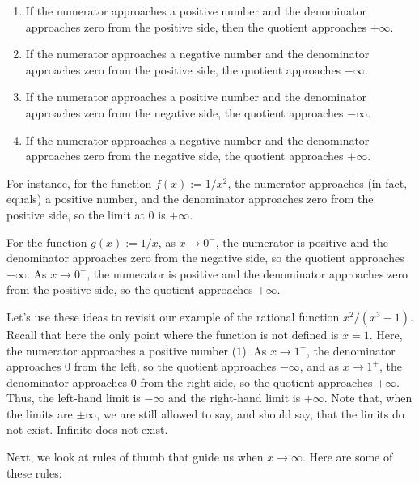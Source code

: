 \documentclass{amsart}
\begin{document}
\begin{enumerate}
\item If the numerator approaches a positive number and the
  denominator approaches zero from the positive side, then the
  quotient approaches $+\infty$. 
\item If the numerator approaches a negative number and the
  denominator approaches zero from the positive side, the quotient
  approaches $-\infty$.
\item If the numerator approaches a positive number and the
  denominator approaches zero from the negative side, the quotient
  approaches $-\infty$.
\item If the numerator approaches a negative number and the
  denominator approaches zero from the negative side, the quotient
  approaches $+\infty$.
\end{enumerate}

For instance, for the function $f(x) := 1/x^2$, the numerator
approaches (in fact, equals) a positive number, and the denominator
approaches zero from the positive side, so the limit at $0$ is
$+\infty$.

For the function $g(x) := 1/x$, as $x \to 0^-$, the numerator is
positive and the denominator approaches zero from the negative side,
so the quotient approaches $-\infty$. As $x \to 0^+$, the numerator is
positive and the denominator approaches zero from the positive side,
so the quotient approaches $+\infty$.

Let's use these ideas to revisit our example of the rational function
$x^2/(x^3 - 1)$. Recall that here the only point where the function is
not defined is $x = 1$. Here, the numerator approaches a positive
number ($1$). As $x \to 1^-$, the denominator approaches $0$ from the
left, so the quotient approaches $-\infty$, and as $x \to 1^+$, the
denominator approaches $0$ from the right side, so the quotient
approaches $+\infty$. Thus, the left-hand limit is $-\infty$ and the
right-hand limit is $+\infty$. Note that, when the limits are $\pm
\infty$, we are still allowed to say, and should say, that the limits
do not exist. Infinite does not exist.

Next, we look at rules of thumb that guide us when $x \to
\infty$. Here are some of these rules:
\end{document}
